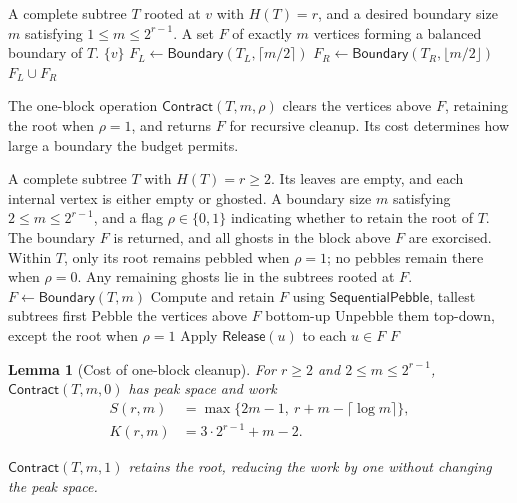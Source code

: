 \documentclass[11pt]{article}
\newtheorem{lemma}[lemma]{Lemma}
\theoremstyle{definition}
\theoremstyle{remark}
\newcommand{\Fast}{\mathsf{SequentialPebble}}
\newcommand{\Release}{\mathsf{Release}}
\newcommand{\Contract}{\mathsf{Contract}}
\begin{document}
\begin{algorithm}[H]
\caption{Constructing a balanced boundary $\mathsf{Boundary}(T,m)$}
\label{alg:boundary}
\begin{algorithmic}[1]
\Require A complete subtree $T$ rooted at $v$ with $H(T)=r$, and a desired boundary size $m$ satisfying $1\le m\le2^{r-1}$.
\Ensure A set $F$ of exactly $m$ vertices forming a balanced boundary of $T$.
 \State \Return $\{v\}$
\EndIf
\State $F_L\gets\mathsf{Boundary}(T_L,\lceil m/2\rceil)$
\State $F_R\gets\mathsf{Boundary}(T_R,\lfloor m/2\rfloor)$
\State \Return $F_L\cup F_R$
\end{algorithmic}
\end{algorithm}

The one-block operation $\Contract(T,m,\rho)$ clears the vertices above $F$, retaining the root when $\rho=1$, and returns $F$ for recursive cleanup. Its cost determines how large a boundary the budget permits.


\begin{algorithm}[H]
\caption{One-block cleanup $\Contract(T,m,\rho)$}
\label{alg:block-contract}
\begin{algorithmic}[1]
\Require A complete subtree $T$ with $H(T)=r\ge2$. Its leaves are empty, and each internal vertex is either empty or ghosted.
\Require A boundary size $m$ satisfying $2\le m\le2^{r-1}$, and a flag $\rho\in\{0,1\}$ indicating whether to retain the root of $T$.
\Ensure The boundary $F$ is returned, and all ghosts in the block above $F$ are exorcised. Within $T$, only its root remains pebbled when $\rho=1$; no pebbles remain there when $\rho=0$. Any remaining ghosts lie in the subtrees rooted at $F$.
\State $F\gets\mathsf{Boundary}(T,m)$
\State Compute and retain $F$ using $\Fast$, tallest subtrees first
\State Pebble the vertices above $F$ bottom-up
\State Unpebble them top-down, except the root when $\rho=1$
\State Apply $\Release(u)$ to each $u\in F$
\State \Return $F$
\end{algorithmic}
\end{algorithm}



\begin{lemma}[Cost of one-block cleanup]
\label{lem:contract}
For $r\ge2$ and $2\le m\le2^{r-1}$, $\Contract(T,m,0)$ has peak space and work
\begin{align}
 S(r,m)&=\max\{2m-1,\ r+m-\lceil\log m\rceil\}, \label{eq:boundary-space}\\
 K(r,m)&=3\cdot2^{r-1}+m-2. \label{eq:block-work}
\end{align}

$\Contract(T,m,1)$ retains the root, reducing the work by one without changing the peak space.
\end{lemma}
\end{document}

